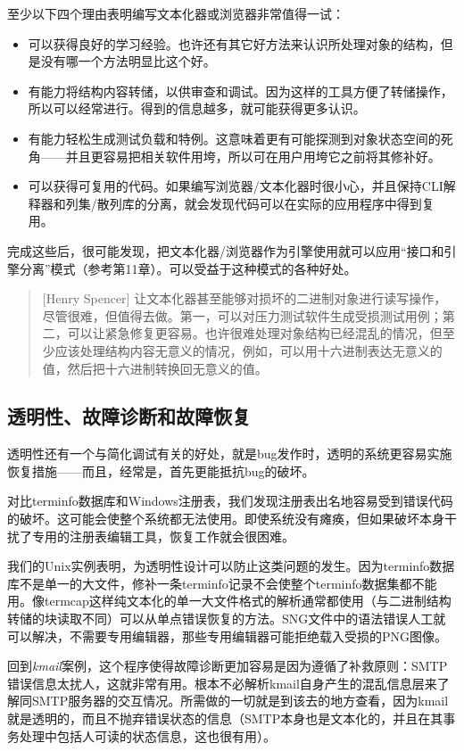 \documentclass[12pt,oneside]{book}
\begin{document}
至少以下四个理由表明编写文本化器或浏览器非常值得一试：
\begin{itemize}
\item 可以获得良好的学习经验。也许还有其它好方法来认识所处理对象的结构，但是没有哪一个方法明显比这个好。
\item 有能力将结构内容转储，以供审查和调试。因为这样的工具方便了转储操作，所以可以经常进行。得到的信息越多，就可能获得更多认识。
\item  有能力轻松生成测试负载和特例。这意味着更有可能探测到对象状态空间的死角——并且更容易把相关软件用垮，所以可在用户用垮它之前将其修补好。
\item 可以获得可复用的代码。如果编写浏览器/文本化器时很小心，并且保持CLI解释器和列集/散列库的分离，就会发现代码可以在实际的应用程序中得到复用。
\end{itemize}

完成这些后，很可能发现，把文本化器/浏览器作为引擎使用就可以应用“接口和引擎分离”模式（参考第11章）。可以受益于这种模式的各种好处。

\begin{quote}[Henry Spencer]
让文本化器甚至能够对损坏的二进制对象进行读写操作，尽管很难，但值得去做。第一，可以对压力测试软件生成受损测试用例；第二，可以让紧急修复更容易。也许很难处理对象结构已经混乱的情况，但至少应该处理结构内容无意义的情况，例如，可以用十六进制表达无意义的值，然后把十六进制转换回无意义的值。
\end{quote}


\subsection{透明性、故障诊断和故障恢复}
透明性还有一个与简化调试有关的好处，就是bug发作时，透明的系统更容易实施恢复措施——而且，经常是，首先更能抵抗bug的破坏。

对比terminfo数据库和Windows注册表，我们发现注册表出名地容易受到错误代码的破坏。这可能会使整个系统都无法使用。即使系统没有瘫痪，但如果破坏本身干扰了专用的注册表编辑工具，恢复工作就会很困难。

我们的Unix实例表明，为透明性设计可以防止这类问题的发生。因为terminfo数据库不是单一的大文件，修补一条terminfo记录不会使整个terminfo数据集都不能用。像termcap这样纯文本化的单一大文件格式的解析通常都使用（与二进制结构转储的块读取不同）可以从单点错误恢复的方法。SNG文件中的语法错误人工就可以解决，不需要专用编辑器，那些专用编辑器可能拒绝载入受损的PNG图像。

回到\textit{kmail}案例，这个程序使得故障诊断更加容易是因为遵循了补救原则：SMTP错误信息太扰人，这就非常有用。根本不必解析kmail自身产生的混乱信息层来了解同SMTP服务器的交互情况。所需做的一切就是到该去的地方查看，因为kmail就是透明的，而且不抛弃错误状态的信息（SMTP本身也是文本化的，并且在其事务处理中包括人可读的状态信息，这也很有用）。
\end{document}
